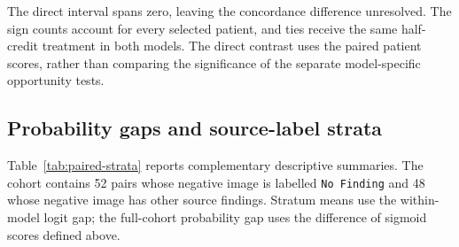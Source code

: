 \begin{table}[H]
\centering
\caption{Within-patient concordance and its direct model contrast.}
\label{tab:paired-concordance}
\end{table}

The direct interval spans zero, leaving the concordance difference
unresolved. The sign counts account for every selected patient, and ties
receive the same half-credit treatment in both models. The direct contrast
uses the paired patient scores, rather than comparing the significance of
the separate model-specific opportunity tests.

\subsection{Probability gaps and source-label strata}

Table~\ref{tab:paired-strata} reports complementary descriptive summaries.
The cohort contains 52 pairs whose negative image is labelled
\texttt{No Finding} and 48 whose negative image has other source findings.
Stratum means use the within-model logit gap; the full-cohort probability
gap uses the difference of sigmoid scores defined above.

\begin{table}[H]
\centering
\caption{Paired response across source-label strata.}
\label{tab:paired-strata}
\end{table}

